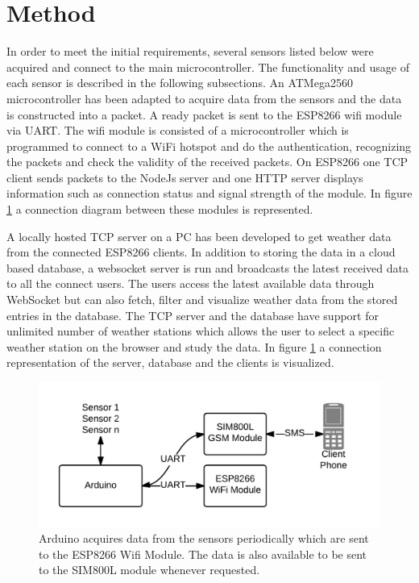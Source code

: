 \section{Method}
\label{sec:method}
In order to meet the initial requirements, several sensors listed below were acquired and connect to the main microcontroller.
The functionality and usage of each sensor is described in the following subsections. An ATMega2560 microcontroller
has been adapted to acquire data from the sensors and the data is constructed into a packet. A ready packet is sent to the
ESP8266 wifi module via UART. The wifi module is consisted of a microcontroller which is programmed to connect to a WiFi hotspot and
do the authentication, recognizing the packets and check the validity of the received packets. On ESP8266 one TCP client sends packets to the NodeJs server
and one HTTP server displays information such as connection status and signal strength of the module. In figure \ref{fig:arduino} a connection diagram
between these modules is represented.

A locally hosted TCP server on a PC has been developed to get weather data from the connected ESP8266 clients. In addition to
storing the data in a cloud based database, a websocket server is run and broadcasts the latest received data to all the connect users.
The users access the latest available data through WebSocket but can also fetch, filter and visualize weather data from the stored entries in the database.
The TCP server and the database have support for unlimited number of weather stations which allows the user to select a specific weather station on the browser and
study the data. In figure \ref{fig:arduino} a connection representation of the server, database and the clients is visualized.

\begin{figure}[p]
    \centering
    \includegraphics[width=\linewidth]{arduino}
    \caption{Arduino acquires data from the sensors periodically which are sent to the ESP8266 Wifi Module.
      The data is also available to be sent to the SIM800L module whenever requested.}
    \label{fig:arduino}
\end{figure}

